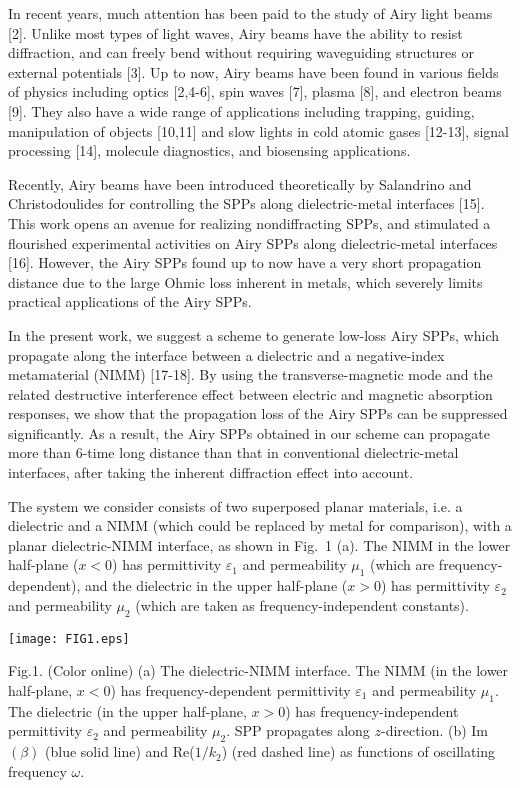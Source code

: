 \documentclass[aps,pra,preprint,groupedaddress,amsmath,amssymb,showpacs]{revtex4-1}
\begin{document}
\vskip 0.75cm

In recent years, much attention has been paid to the study of Airy light beams [2]. Unlike most types of light waves, Airy beams have the ability to resist diffraction, and can freely bend without requiring waveguiding structures or external potentials [3]. Up to now, Airy beams have been found in various fields of physics including optics [2,4-6], spin waves [7], plasma [8], and electron beams [9]. They also have a wide range of applications including trapping, guiding, manipulation of objects [10,11] and slow lights in cold atomic gases [12-13], signal processing [14], molecule diagnostics, and biosensing applications.

\vskip 0.75cm

Recently, Airy beams have been introduced theoretically by Salandrino and Christodoulides for controlling the SPPs along dielectric-metal interfaces [15]. This work opens an avenue for realizing nondiffracting SPPs, and stimulated a flourished experimental activities on Airy SPPs along dielectric-metal interfaces [16]. However, the Airy SPPs found up to now have a very short propagation distance due to the large Ohmic loss inherent in metals, which severely limits practical applications of the Airy SPPs.

\vskip 0.75cm

In the present work, we suggest a scheme to generate low-loss Airy SPPs, which propagate along the interface between a dielectric and a negative-index metamaterial (NIMM) [17-18]. By using the transverse-magnetic mode and the related destructive interference effect between electric and magnetic absorption responses,
we show that the propagation loss of the Airy SPPs can be suppressed significantly. As a result, the Airy SPPs obtained in our scheme can propagate more than 6-time long distance than that in conventional dielectric-metal interfaces, after taking the inherent diffraction effect into account.

\vskip 0.75cm

The system we consider consists of two superposed planar materials, i.e.
a dielectric and a NIMM (which could be replaced by metal for comparison), with a planar dielectric-NIMM interface, as shown in Fig.~1 (a). The NIMM in the lower half-plane ($x<0$) has permittivity $\varepsilon_1$
and permeability $\mu_1$ (which are frequency-dependent), and the dielectric in the upper half-plane ($x>0$) has permittivity $\varepsilon_2$ and permeability $\mu_2$
(which are taken as frequency-independent constants).
%
\begin{center}
\texttt{[image: FIG1.eps]}
\end{center}
\vskip 0.6cm \small \rm Fig.\hspace{0.1cm}1. (Color online) (a) The dielectric-NIMM interface. The NIMM (in the lower half-plane, $x<0$) has frequency-dependent permittivity
$\varepsilon_1$ and permeability $\mu_1$. The dielectric (in the upper half-plane, $x>0$) has frequency-independent permittivity $\varepsilon_2$ and permeability $\mu_2$.
SPP propagates along $z$-direction. (b) Im$(\beta)$ (blue solid line) and Re($1/k_2$) (red dashed line) as functions of oscillating frequency $\omega$.
\vskip 0.8cm \noindent \normalsize
\end{document}
